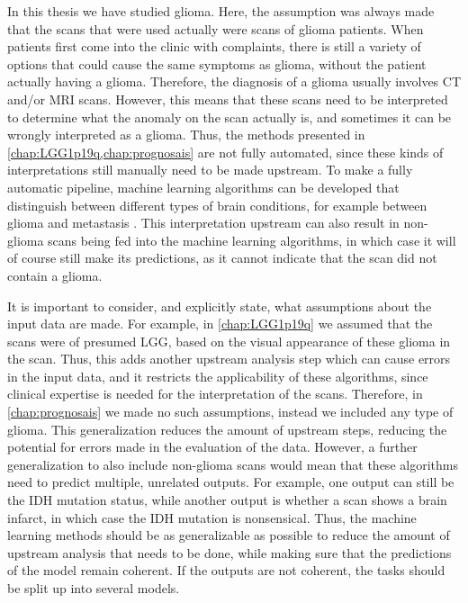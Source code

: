 In this thesis we have studied glioma.
Here, the assumption was always made that the scans that were used actually were scans of glioma patients.
When patients first come into the clinic with complaints, there is still a variety of options that could cause the same symptoms as glioma, without the patient actually having a glioma.
Therefore, the diagnosis of a glioma usually involves \gls{CT} and/or \gls{MRI} scans.
However, this means that these scans need to be interpreted to determine what the anomaly on the scan actually is, and sometimes it can be wrongly interpreted as a glioma.
Thus, the methods presented in \cref{chap:LGG1p19q,chap:prognosais} are not fully automated, since these kinds of interpretations still manually need to be made upstream.
To make a fully automatic pipeline, machine learning algorithms can be developed that distinguish between different types of brain conditions, for example between glioma and metastasis \autocite{chen2019metastatic}.
This interpretation upstream can also result in non-glioma scans being fed into the machine learning algorithms, in which case it will of course still make its predictions, as it cannot indicate that the scan did not contain a glioma.

It is important to consider, and explicitly state, what assumptions about the input data are made.
For example, in \cref{chap:LGG1p19q} we assumed that the scans were of presumed \gls{LGG}, based on the visual appearance of these glioma in the scan.
Thus, this adds another upstream analysis step which can cause errors in the input data, and it restricts the applicability of these algorithms, since clinical expertise is needed for the interpretation of the scans.
Therefore, in \cref{chap:prognosais} we made no such assumptions, instead we included any type of glioma.
This generalization reduces the amount of upstream steps, reducing the potential for errors made in the evaluation of the data.
However, a further generalization to also include non-glioma scans would mean that these algorithms need to predict multiple, unrelated outputs.
For example, one output can still be the \gls{IDH} mutation status, while another output is whether a scan shows a brain infarct, in which case the \gls{IDH} mutation is nonsensical.
Thus, the machine learning methods should be as generalizable as possible to reduce the amount of upstream analysis that needs to be done, while making sure that the predictions of the model remain coherent.
If the outputs are not coherent, the tasks should be split up into several models.




